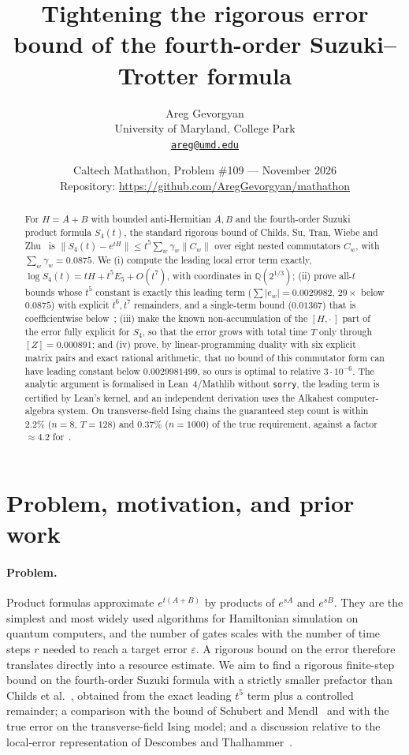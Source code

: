 \documentclass[11pt]{article}
\title{Tightening the rigorous error bound of the fourth-order Suzuki--Trotter formula}
\author{Areg Gevorgyan\\ University of Maryland, College Park\\ \href{mailto:areg@umd.edu}{\texttt{areg@umd.edu}}}
\date{Caltech Mathathon, Problem \#109 --- November 2026\\[0.6em]
\small Repository: \url{https://github.com/AregGevorgyan/mathathon}}
\newcommand{\norm}[1]{\lVert #1\rVert}
\newcommand{\abs}[1]{\lvert #1\rvert}
\newcommand{\Qc}{\mathbb{Q}(2^{1/3})}
\newcommand{\lb}[1]{[#1]}
\theoremstyle{plain}
\theoremstyle{definition}
\theoremstyle{remark}
\begin{document}
\maketitle

\begin{abstract}
For $H=A+B$ with bounded anti-Hermitian $A,B$ and the fourth-order Suzuki product formula $S_4(t)$,
the standard rigorous bound of Childs, Su, Tran, Wiebe and Zhu~\cite{Childs2021} is
$\norm{S_4(t)-e^{tH}}\le t^5\sum_w\gamma_w\norm{C_w}$ over eight nested commutators $C_w$, with
$\sum_w\gamma_w=0.0875$. We (i) compute the leading local error term exactly,
$\log S_4(t)=tH+t^5E_5+O(t^7)$, with coordinates in $\Qc$; (ii) prove all-$t$ bounds whose $t^5$
constant is exactly this leading term ($\sum\abs{e_w}=0.0029982$, $29\times$ below $0.0875$) with explicit
$t^6,t^7$ remainders, and a single-term bound ($0.01367$) that is coefficientwise below~\cite{Childs2021};
(iii) make the known non-accumulation of the $[H,\cdot\,]$ part of the error fully explicit for $S_4$, so that
the error grows with total time $T$ only through $\lb Z=0.000891$; and (iv) prove, by linear-programming
duality with six explicit matrix pairs and exact rational arithmetic, that no bound of this commutator
form can have leading constant below $0.0029981499$, so ours is optimal to relative $3\cdot10^{-6}$.
The analytic argument is formalised in Lean~4/Mathlib without \texttt{sorry}, the leading term is
certified by Lean's kernel, and an independent derivation uses the Alkahest computer-algebra system. On
transverse-field Ising chains the guaranteed step count is within $2.2\%$ ($n=8$, $T=128$) and $0.37\%$
($n=1000$) of the true requirement, against a factor $\approx4.2$ for~\cite{Childs2021}.
\end{abstract}

\tableofcontents

\section{Problem, motivation, and prior work}\label{sec:intro}

\paragraph{Problem.} Product formulas approximate $e^{t(A+B)}$ by products of $e^{sA}$ and $e^{sB}$.
They are the simplest and most widely used algorithms for Hamiltonian simulation on quantum computers,
and the number of gates scales with the number of time steps $r$ needed to reach a target error
$\varepsilon$. A rigorous bound on the error therefore translates directly into a resource estimate.
We aim to find a rigorous finite-step bound on the fourth-order Suzuki formula with
a strictly smaller prefactor than Childs et al.~\cite{Childs2021}, obtained from the exact leading
$t^5$ term plus a controlled remainder; a comparison with the bound of Schubert and
Mendl~\cite{SchubertMendl2023} and with the true error on the transverse-field Ising model; and a
discussion relative to the local-error representation of Descombes and
Thalhammer~\cite{DescombesThalhammer2010}.
\end{document}
